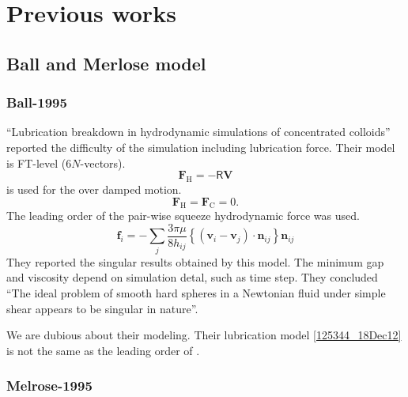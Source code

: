 \documentclass[11pt]{scrartcl}
\newcommand{\tens}[1]{\bm{\mathsf{#1}}}
\begin{document}
\section{Previous works}
\subsection*{Ball and Merlose model}

\subsubsection*{Ball-1995}

\citet{Ball_1995} ``Lubrication breakdown in hydrodynamic simulations of concentrated colloids''
reported the difficulty of the simulation including lubrication force.
Their model is FT-level ($6N$-vectors).
\begin{equation}
 \bm{F}_{\mathrm{H}} = - \tens{R} \bm{V}
\end{equation}
is used for the over damped motion.
\begin{equation}
 \bm{F}_{\mathrm{H}} = \bm{F}_{\mathrm{C}} = 0.
\end{equation}
%
The leading order of the pair-wise squeeze hydrodynamic force
was used.
\begin{equation}
 \bm{f}_i = 
- \sum_j \frac{3 \pi \mu}{8 h_{ij}} 
\left\{
(\bm{v}_i - \bm{v}_j)\cdot \bm{n}_{ij}
\right\} \bm{n}_{ij}\label{125344_18Dec12}
\end{equation}
%
They reported the singular results obtained by this model.
%
The minimum gap and viscosity 
depend on simulation detal, such as time step.
%
They concluded
``The ideal problem of smooth hard spheres
in a Newtonian fluid under simple shear appears
to be singular in nature''.
%


We are dubious about their modeling.
%
Their lubrication model \eqref{125344_18Dec12}
is not the same as the leading order of \citet{Jeffrey_1992}.



%

\subsubsection*{Melrose-1995}
\end{document}
